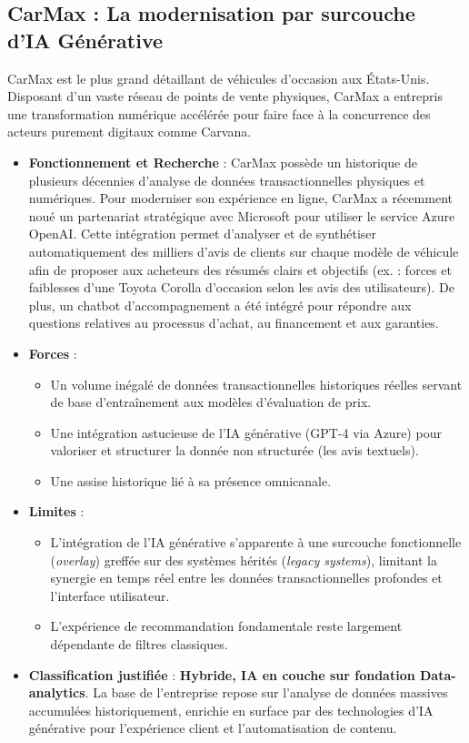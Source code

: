 \documentclass[11pt,a4paper]{article}
\begin{document}
\subsection{CarMax : La modernisation par surcouche d'IA Générative}
CarMax est le plus grand détaillant de véhicules d'occasion aux États-Unis. Disposant d'un vaste réseau de points de vente physiques, CarMax a entrepris une transformation numérique accélérée pour faire face à la concurrence des acteurs purement digitaux comme Carvana.

\begin{itemize}
    \item \textbf{Fonctionnement et Recherche} : CarMax possède un historique de plusieurs décennies d'analyse de données transactionnelles physiques et numériques. Pour moderniser son expérience en ligne, CarMax a récemment noué un partenariat stratégique avec Microsoft pour utiliser le service Azure OpenAI. Cette intégration permet d'analyser et de synthétiser automatiquement des milliers d'avis de clients sur chaque modèle de véhicule afin de proposer aux acheteurs des résumés clairs et objectifs (ex. : forces et faiblesses d'une Toyota Corolla d'occasion selon les avis des utilisateurs). De plus, un chatbot d'accompagnement a été intégré pour répondre aux questions relatives au processus d'achat, au financement et aux garanties.
    \item \textbf{Forces} :
    \begin{itemize}
        \item Un volume inégalé de données transactionnelles historiques réelles servant de base d'entraînement aux modèles d'évaluation de prix.
        \item Une intégration astucieuse de l'IA générative (GPT-4 via Azure) pour valoriser et structurer la donnée non structurée (les avis textuels).
        \item Une assise historique lié à sa présence omnicanale.
    \end{itemize}
    \item \textbf{Limites} :
    \begin{itemize}
        \item L'intégration de l'IA générative s'apparente à une surcouche fonctionnelle (\textit{overlay}) greffée sur des systèmes hérités (\textit{legacy systems}), limitant la synergie en temps réel entre les données transactionnelles profondes et l'interface utilisateur.
        \item L'expérience de recommandation fondamentale reste largement dépendante de filtres classiques.
    \end{itemize}
    \item \textbf{Classification justifiée} : \textbf{Hybride, IA en couche sur fondation Data-analytics}. La base de l'entreprise repose sur l'analyse de données massives accumulées historiquement, enrichie en surface par des technologies d'IA générative pour l'expérience client et l'automatisation de contenu.
\end{itemize}
\end{document}

